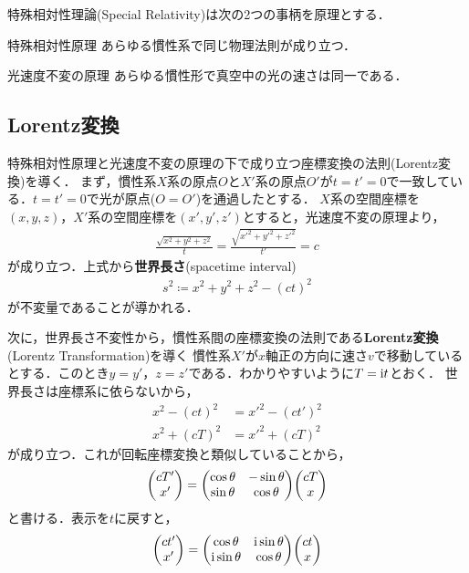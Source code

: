 \documentclass{report}
\begin{document}
  特殊相対性理論(Special Relativity)は次の2つの事柄を原理とする．
  \begin{itembox}[l]{特殊相対性原理}
    あらゆる慣性系で同じ物理法則が成り立つ．
  \end{itembox}
  \begin{itembox}[l]{光速度不変の原理}
    あらゆる慣性形で真空中の光の速さは同一である．
  \end{itembox}
  \subsection{Lorentz変換}
    特殊相対性原理と光速度不変の原理の下で成り立つ座標変換の法則(Lorentz変換)を導く．
    まず，慣性系$X$系の原点$O$と$X'$系の原点$O'$が$t = t' = 0$で一致している．$t = t' = 0$で光が原点($O = O'$)を通過したとする．
    $X$系の空間座標を$(x, y, z)$，$X'$系の空間座標を$(x', y', z')$とすると，光速度不変の原理より，
    \begin{align}
      \frac{\sqrt{x^2 + y^2 + z^2}}{t} = \frac{\sqrt{x'^2 + y'^2 + z'^2}}{t'} = c
    \end{align}
    が成り立つ．上式から\textbf{世界長さ}(spacetime interval)
    \begin{align}
      s^2 \coloneqq x^2 + y^2 + z^2 - (ct)^2
    \end{align}
    が不変量であることが導かれる．
    \par
    次に，世界長さ不変性から，慣性系間の座標変換の法則である\textbf{Lorentz変換}(Lorentz Transformation)を導く
    慣性系$X'$が$x$軸正の方向に速さ$v$で移動しているとする．このとき$y=y'，z=z'$である．わかりやすいように$T=\mathrm{i} t$とおく．
    世界長さは座標系に依らないから，
    \begin{align}
      x^2 - (ct)^2 &= x'^2 - (ct')^2\\
      x^2 + (cT)^2 &= x'^2 + (cT)^2
    \end{align}
    が成り立つ．これが回転座標変換と類似していることから，
    \begin{align}
      \mqty(cT' \\ x') 
      = \mqty(
        \cos\theta & -\sin\theta\\
        \sin\theta & \cos\theta
      )
      \mqty(cT \\ x)
    \end{align}
    と書ける．表示を$t$に戻すと，
    \begin{align}
      \mqty(ct' \\ x')
      =
      \mqty(
        \cos\theta & \i\sin\theta\\
        \i\sin\theta & \cos\theta
      )
      \mqty(ct\\ x)
    \end{align}
\end{document}
